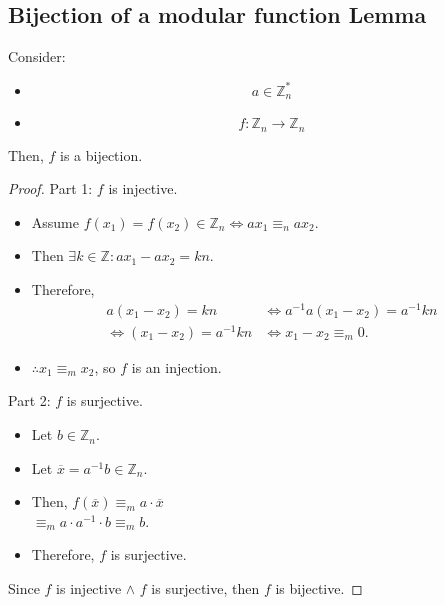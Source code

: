 \subsection{Bijection of a modular function Lemma}
\begin{lemma}\label{bijection_lemma}
    Consider:
    \begin{itemize}
        \item \[a \in \mathbb{Z}_{n}^{*}\]
        \item \[f: \mathbb{Z}_{n} \rightarrow \mathbb{Z}_{n}\]
    \end{itemize}
    Then, $f$ is a bijection.\newline
\end{lemma}
\begin{proof}
    Part 1: $f$ is injective.
    \begin{itemize}
        \item Assume $f(x_{1}) = f(x_{2}) \in \mathbb{Z}_{n} \iff ax_{1} \equiv_{n} ax_{2}$.
        \item Then $\exists k \in \mathbb{Z}: ax_{1} - ax_{2} = kn$.
        \item Therefore,
        \begin{align*}
            a(x_{1} - x_{2}) = kn & \iff a^{-1}a(x_{1} - x_{2}) = a^{-1}kn\\
            \iff (x_{1} - x_{2}) = a^{-1}kn & \iff x_{1} - x_{2} \equiv_{m} 0.
        \end{align*}
        \item $\therefore x_{1} \equiv_{m} x_{2}$, so $f$ is an injection.
    \end{itemize}
    Part 2: $f$ is surjective.
    \begin{itemize}
        \item Let $b \in \mathbb{Z}_{n}$.
        \item Let $\overline{x} = a^{-1}b \in \mathbb{Z}_{n}$.
        \item Then, $f(\overline{x}) \equiv_{m} a \cdot \overline{x}$\\
        $\equiv_{m} a \cdot a^{-1} \cdot b \equiv_{m} b$.
        \item Therefore, $f$ is surjective.
    \end{itemize}
    Since $f$ is injective $\land$ $f$ is surjective, then $f$ is bijective.
\end{proof}

